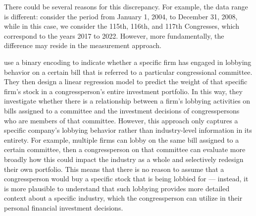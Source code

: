 \documentclass[15pt,letterpaper]{article}
\begin{document}
There could be several reasons for this discrepancy. For example, the data range is different: \cite{eg14} consider the period from January 1, 2004, to December 31, 2008, while in this case, we consider the 115th, 116th, and 117th Congresses, which correspond to the years 2017 to 2022. However, more fundamentally, the difference may reside in the measurement approach.

\cite{eg14} use a binary encoding to indicate whether a specific firm has engaged in lobbying behavior on a certain bill that is referred to a particular congressional committee. They then design a linear regression model to predict the weight of that specific firm's stock in a congressperson's entire investment portfolio. In this way, they investigate whether there is a relationship between a firm's lobbying activities on bills assigned to a committee and the investment decisions of congresspersons who are members of that committee. However, this approach only captures a specific company's lobbying behavior rather than industry-level information in its entirety. For example, multiple firms can lobby on the same bill assigned to a certain committee, then a congressperson on that committee can evaluate more broadly how this could impact the industry as a whole and selectively redesign their own portfolio. This means that there is no reason to assume that a congressperson would buy a specific stock that is being lobbied for — instead, it is more plausible to understand that such lobbying provides more detailed context about a specific industry, which the congressperson can utilize in their personal financial investment decisions.
\end{document}
